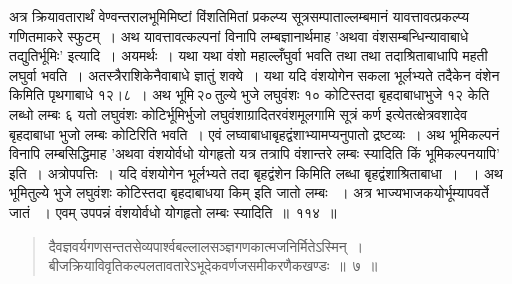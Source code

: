\documentclass[11pt, openany]{book}
\begin{document}
\newpage

\begin{sloppypar}
अत्र क्रियावतारार्थं वेण्वन्तरालभूमिमिष्टां विंशतिमितां प्रकल्प्य सूत्रसम्पाताल्लम्बमानं यावत्तावत्प्रकल्प्य गणितमाकरे स्फुटम्~। अथ यावत्तावत्कल्पनां विनापि लम्बज्ञानार्थमाह 'अथवा वंशसम्बन्धिन्यावाबाधे तद्युतिर्भूमिः' इत्यादि~। अयमर्थः~। यथा यथा वंशो महाल्लँघुर्वा भवति तथा तथा तदाश्रिताबाधापि महती लघुर्वा भवति~। अतस्त्रैराशिकेनैवाबाधे ज्ञातुं शक्ये~। यथा यदि वंशयोगेन सकला भूर्लभ्यते तदैकेन वंशेन किमिति पृथगाबाधे १२।८~। अथ भूमि\textendash \,२०\textendash \,तुल्ये भुजे लघुवंशः १० कोटिस्तदा बृहदाबाधाभुजे १२ केति लब्धो लम्बः ६ यतो लघुवंशः कोटिर्भूमिर्भुजो लघुवंशाग्रादितरवंशमूलगामि सूत्रं कर्ण इत्येतत्क्षेत्रवशादेव बृहदाबाधा भुजो लम्बः कोटिरिति भवति~। एवं लघ्वाबाधाबृहद्वंशाभ्यामप्यनुपातो द्रष्टव्यः~। अथ भूमिकल्पनं विनापि लम्बसिद्धिमाह 'अथवा वंशयोर्वधो योगहृतो यत्र तत्रापि वंशान्तरे लम्बः स्यादिति किं भूमिकल्पनयापि' इति~। अत्रोपपत्तिः~। यदि वंशयोगेन भूर्लभ्यते तदा बृहद्वंशेन किमिति लब्धा बृहद्वंशाश्रिताबाधा~। ~। अथ भूमितुल्ये भुजे लघुवंशः कोटिस्तदा बृहदाबाधया किम् इति जातो लम्बः ~। अत्र भाज्यभाजकयोर्भूम्यापवर्ते जातं ~। एवम् उपपन्नं वंशयोर्वधो योगहृतो लम्बः स्यादिति~॥~११४~॥
\vspace{2mm}

\begin{quote}
{\color{violet}दैवज्ञवर्यगणसन्ततसेव्यपार्श्वबल्लालसञ्ज्ञगणकात्मजनिर्मितेऽस्मिन्~।\\
बीजक्रियाविवृतिकल्पलतावतारेऽभूदेकवर्णजसमीकरणैकखण्डः~॥~७~॥}
\end{quote}
\vspace{-1mm}


\end{sloppypar}
\end{document}

